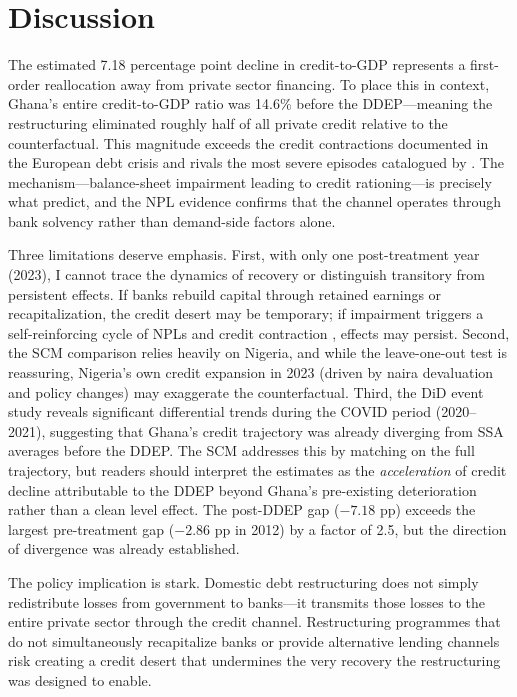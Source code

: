 \documentclass[12pt]{article}
\begin{document}
\section{Discussion}

The estimated 7.18 percentage point decline in credit-to-GDP represents a first-order reallocation away from private sector financing. To place this in context, Ghana's entire credit-to-GDP ratio was 14.6\% before the DDEP---meaning the restructuring eliminated roughly half of all private credit relative to the counterfactual. This magnitude exceeds the credit contractions documented in the European debt crisis \citep{kalemliozcan2016, popov2015exporting} and rivals the most severe episodes catalogued by \citet{reinhart2009aftermath}. The mechanism---balance-sheet impairment leading to credit rationing---is precisely what \citet{gennaioli2018sovereign} predict, and the NPL evidence confirms that the channel operates through bank solvency rather than demand-side factors alone.

Three limitations deserve emphasis. First, with only one post-treatment year (2023), I cannot trace the dynamics of recovery or distinguish transitory from persistent effects. If banks rebuild capital through retained earnings or recapitalization, the credit desert may be temporary; if impairment triggers a self-reinforcing cycle of NPLs and credit contraction \citep{bernanke1983}, effects may persist. Second, the SCM comparison relies heavily on Nigeria, and while the leave-one-out test is reassuring, Nigeria's own credit expansion in 2023 (driven by naira devaluation and policy changes) may exaggerate the counterfactual. Third, the DiD event study reveals significant differential trends during the COVID period (2020--2021), suggesting that Ghana's credit trajectory was already diverging from SSA averages before the DDEP. The SCM addresses this by matching on the full trajectory, but readers should interpret the estimates as the \textit{acceleration} of credit decline attributable to the DDEP beyond Ghana's pre-existing deterioration rather than a clean level effect. The post-DDEP gap ($-7.18$ pp) exceeds the largest pre-treatment gap ($-2.86$ pp in 2012) by a factor of 2.5, but the direction of divergence was already established.

The policy implication is stark. Domestic debt restructuring does not simply redistribute losses from government to banks---it transmits those losses to the entire private sector through the credit channel. Restructuring programmes that do not simultaneously recapitalize banks or provide alternative lending channels risk creating a credit desert that undermines the very recovery the restructuring was designed to enable.
\end{document}
